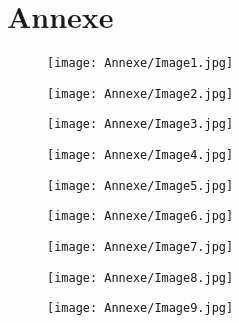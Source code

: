 \chapter*{Annexe} 


    \begin{figure}[H]
   \centering
   \texttt{[image: Annexe/Image1.jpg]}
	\caption{\cite{realsoc}}\label{fig:realsoc}
    \end{figure}


    \begin{figure}[H]
   \centering
   \texttt{[image: Annexe/Image2.jpg]}
	\caption{\cite{courbetcommunard}}\label{fig:commune}
    \end{figure}


    \begin{figure}[H]
   \centering
   \texttt{[image: Annexe/Image3.jpg]}
	\caption{\cite{baudelairepeintres}}\label{fig:baudelaire}
    \end{figure}


    \begin{figure}[H]
   \centering
   \texttt{[image: Annexe/Image4.jpg]}
	\caption{\cite{pabloneruda}}\label{fig:neruda}
    \end{figure}


    \begin{figure}[H]
   \centering
   \texttt{[image: Annexe/Image5.jpg]}
	\caption{\cite{nouvelleformule}}\label{fig:formule}
    \end{figure}


    \begin{figure}[H]
   \centering
   \texttt{[image: Annexe/Image6.jpg]}
	\caption{\cite{journallimbour}}\label{fig:journallimbour}
    \end{figure}


    \begin{figure}[H]
   \centering
   \texttt{[image: Annexe/Image7.jpg]}
	\caption{\cite{pabloneruda}}\label{fig:neruda2}
    \end{figure}


    \begin{figure}[H]
   \centering
   \texttt{[image: Annexe/Image8.jpg]}
	\caption{\cite{atraversgaleries}}\label{fig:galeries}
    \end{figure}


    \begin{figure}[H]
   \centering
   \texttt{[image: Annexe/Image9.jpg]}
	\caption{\cite{entretienmasson}}\label{fig:masson}
    \end{figure}



